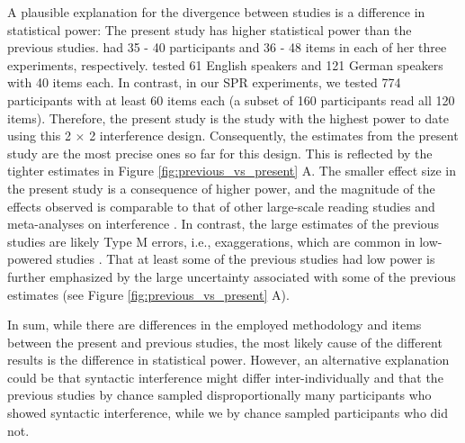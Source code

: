 \documentclass[review,preprint,12pt,authoryear,floatsintext]{elsarticle}
\begin{document}
{{A plausible explanation for the divergence between studies is a difference in statistical power: The present study has higher statistical power than the previous studies. \citet{vandyke07} had 35 - 40 participants and 36 - 48 items in each of her three experiments, respectively. \cite{mertzen} tested 61 English speakers and 121 German speakers with 40 items each. In contrast, in our SPR experiments, we tested 774 participants with at least 60 items each (a subset of 160 participants read all 120 items). Therefore, the present study is the study with the highest power to date using this 2 $\times$ 2 interference design. Consequently, the estimates from the present study are the most precise ones so far for this design. This is reflected by the tighter estimates in Figure \ref{fig:previous_vs_present} A. The smaller effect size in the present study is a consequence of higher power, and the magnitude of the effects observed is comparable to that of other large-scale reading studies \citep{nicenboim} and meta-analyses on interference \citep{jaeger_etal_2017}. In contrast, the large estimates of the previous studies are likely Type M errors, i.e., exaggerations, which are common in low-powered studies \citep{gelman_carlin}. That at least some of the previous studies had low power is further emphasized by the large uncertainty associated with some of the previous estimates (see Figure \ref{fig:previous_vs_present} A).

In sum, while there are differences in the employed methodology and items between the present and previous studies, the most likely cause of the different results is the difference in statistical power. However, an alternative explanation could be that syntactic interference might differ inter-individually \citep{yadav2021individual} and that the previous studies by chance sampled disproportionally many participants who showed syntactic interference, while we by chance sampled participants who did not.

}}
\end{document}
